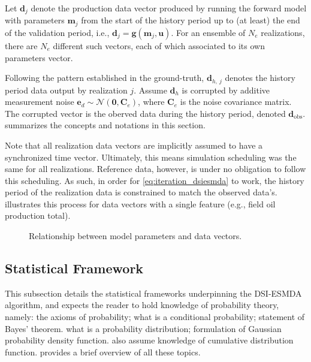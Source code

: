 Let $\mathbf{d}_j$ denote the production data vector produced by 
running the forward model with parameters $\mathbf{m}_j$
from the start of the history period up to (at least) the end of the validation period,
i.e., $\mathbf{d}_j = \mathbf{g}(\mathbf{m}_j, \mathbf{u})$.
For an ensemble of $N_e$ realizations, there are $N_e$ different such vectors, 
each of which associated to its own parameters vector.

Following the pattern established in the ground-truth, 
$\mathbf{d}_{h,\ j}$ denotes the history period data output by realization $j$.
Assume $\mathbf{d}_h$ is corrupted by additive measurement noise $\mathbf{e}_d\sim \mathcal{N}(\mathbf{0}, \mathbf{C}_e)$,
where $\mathbf{C}_e$ is the noise covariance matrix.
The corrupted vector is the oberved data during the history period, denoted $\mathbf{d}_\text{obs}$.
%
 summarizes the concepts and notations in this section.

\begin{note}
    Note that all realization data vectors are implicitly assumed to have a synchronized time vector.
    Ultimately, this means simulation scheduling was the same for all realizations. 
    Reference data, however, is under no obligation to follow this scheduling.
    As such, in order for \cref{eq:iteration_dsiesmda} to work,
    the history period of the realization data is constrained to match the observed data's.
     illustrates this process 
    for data vectors with a single feature (e.g., field oil production total). 
    \begin{center}
        \label{fig:time-vector-illustration}
        
    \end{center}
\end{note}

\begin{figure}[htbp]
    \centering
    \caption{%
        Relationship between model parameters and data vectors. 
    }
    \label{fig:data-vectors}
    
\end{figure}

\subsection{Statistical Framework}
\label{subsec:statistical-framework}
This subsection details the statistical frameworks underpinning the DSI-ESMDA algorithm,
and expects the reader to hold knowledge of probability theory, namely:
the axioms of probability; 
what is a conditional probability; 
statement of Bayes' theorem.
what is a probability distribution; 
formulation of Gaussian probability density function.
%
 also assume knowledge of cumulative distribution function. 
%
 provides a brief overview of all these topics.

